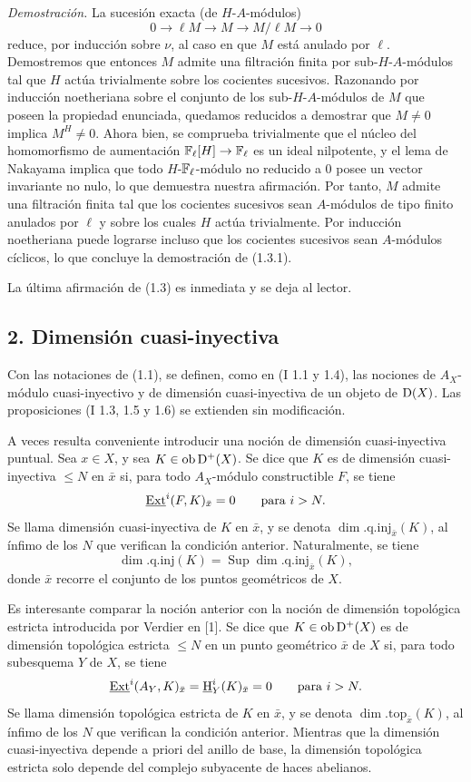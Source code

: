 \emph{Demostración.} La sucesión exacta (de $H$-$A$-módulos)
\[
        0\longrightarrow \ell M\longrightarrow M\longrightarrow M/\ell M\longrightarrow 0
\]
reduce, por inducción sobre $\nu$, al caso en que $M$ está anulado por $\ell$. Demostremos que entonces $M$ admite una filtración finita por sub-$H$-$A$-módulos tal que $H$ actúa trivialmente sobre los cocientes sucesivos. Razonando por inducción noetheriana sobre el conjunto de los sub-$H$-$A$-módulos de $M$ que poseen la propiedad enunciada, quedamos reducidos a demostrar que $M\neq0$ implica $M^H\neq0$. Ahora bien, se comprueba trivialmente que el núcleo del homomorfismo de aumentación $\mathbb{F}_\ell[H]\to\mathbb{F}_\ell$ es un ideal nilpotente, y el lema de Nakayama implica que todo $H$-$\mathbb{F}_\ell$-módulo no reducido a $0$ posee un vector invariante no nulo, lo que demuestra nuestra afirmación. Por tanto, $M$ admite una filtración finita tal que los cocientes sucesivos sean $A$-módulos de tipo finito anulados por $\ell$ y sobre los cuales $H$ actúa trivialmente. Por inducción noetheriana puede lograrse incluso que los cocientes sucesivos sean $A$-módulos cíclicos, lo que concluye la demostración de (1.3.1).

La última afirmación de (1.3) es inmediata y se deja al lector.

\subsection*{2. Dimensión cuasi-inyectiva}

Con las notaciones de (1.1), se definen, como en (I 1.1 y 1.4), las nociones de $A_X$-módulo cuasi-inyectivo y de dimensión cuasi-inyectiva de un objeto de $\mathrm{D}(X)$. Las proposiciones (I 1.3, 1.5 y 1.6) se extienden sin modificación.

A veces resulta conveniente introducir una noción de dimensión cuasi-inyectiva puntual. Sea $x\in X$, y sea $K\in\operatorname{ob} \mathrm{D}^+(X)$. Se dice que $K$ es de dimensión cuasi-inyectiva $\leq N$ en $\bar{x}$ si, para todo $A_X$-módulo constructible $F$, se tiene
\[
        \underline{\operatorname{Ext}}^{i}(F,K)_{\bar{x}}=0\qquad\hbox{para }i>N.
\]
Se llama dimensión cuasi-inyectiva de $K$ en $\bar{x}$, y se denota $\dim.\mathrm{q.inj}_{\bar{x}}(K)$, al ínfimo de los $N$ que verifican la condición anterior. Naturalmente, se tiene
\[
        \dim.\mathrm{q.inj}(K)=\operatorname{Sup}\dim.\mathrm{q.inj}_{\bar{x}}(K),
\]
donde $\bar{x}$ recorre el conjunto de los puntos geométricos de $X$.

Es interesante comparar la noción anterior con la noción de dimensión topológica estricta introducida por Verdier en [1]. Se dice que $K\in\operatorname{ob} \mathrm{D}^+(X)$ es de dimensión topológica estricta $\leq N$ en un punto geométrico $\bar{x}$ de $X$ si, para todo subesquema $Y$ de $X$, se tiene
\[
        \underline{\operatorname{Ext}}^{i}(A_Y,K)_{\bar{x}}=\underline{\mathrm H}^i_Y(K)_{\bar{x}}=0\qquad\hbox{para }i>N.
\]
Se llama dimensión topológica estricta de $K$ en $\bar{x}$, y se denota $\dim.\mathrm{top}_{\bar{x}}(K)$, al ínfimo de los $N$ que verifican la condición anterior. Mientras que la dimensión cuasi-inyectiva depende a priori del anillo de base, la dimensión topológica estricta solo depende del complejo subyacente de haces abelianos.

